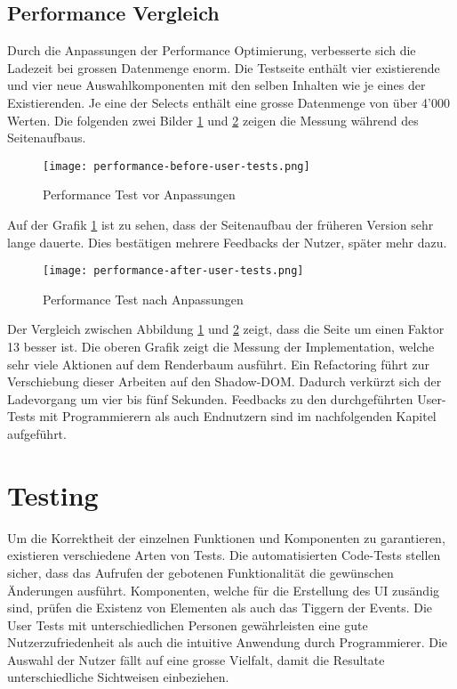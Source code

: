 \subsection{Performance Vergleich}
\label{sec:performanceCompare}

Durch die Anpassungen der Performance Optimierung, verbesserte sich die Ladezeit bei grossen Datenmenge enorm.
Die Testseite enthält vier existierende und vier neue Auswahlkomponenten mit den selben Inhalten wie je eines der Existierenden.
Je eine der Selects enthält eine grosse Datenmenge von über 4'000 Werten.
Die folgenden zwei Bilder \ref{img:PerformanceTestBefore} und \ref{img:PerformanceTestAfter} zeigen die Messung während des Seitenaufbaus.

\begin{figure}[!htb]
    \centering
    \texttt{[image: performance-before-user-tests.png]}
    \caption{Performance Test vor Anpassungen}
    \label{img:PerformanceTestBefore}
\end{figure}

Auf der Grafik \ref{img:PerformanceTestBefore} ist zu sehen, dass der Seitenaufbau der früheren Version sehr lange dauerte.
Dies bestätigen mehrere Feedbacks der Nutzer, später mehr dazu.

\begin{figure}[!htb]
    \centering
    \texttt{[image: performance-after-user-tests.png]}
    \caption{Performance Test nach Anpassungen}
    \label{img:PerformanceTestAfter}
\end{figure}

Der Vergleich zwischen Abbildung \ref{img:PerformanceTestBefore} und \ref{img:PerformanceTestAfter} zeigt, dass die Seite um einen Faktor 13 besser ist.
Die oberen Grafik zeigt die Messung der Implementation, welche sehr viele Aktionen auf dem Renderbaum ausführt.
Ein Refactoring führt zur Verschiebung dieser Arbeiten auf den Shadow-DOM.
Dadurch verkürzt sich der Ladevorgang um vier bis fünf Sekunden.
Feedbacks zu den durchgeführten User-Tests mit Programmierern als auch Endnutzern sind im nachfolgenden Kapitel aufgeführt.


\section{Testing}
\label{sec:testing}

Um die Korrektheit der einzelnen Funktionen und Komponenten zu garantieren, existieren verschiedene Arten von Tests.
Die automatisierten Code-Tests stellen sicher, dass das Aufrufen der gebotenen Funktionalität die gewünschen Änderungen ausführt.
Komponenten, welche für die Erstellung des UI zusändig sind, prüfen die Existenz von Elementen als auch das Tiggern der Events.
Die User Tests mit unterschiedlichen Personen gewährleisten eine gute Nutzerzufriedenheit als auch die intuitive Anwendung durch Programmierer.
Die Auswahl der Nutzer fällt auf eine grosse Vielfalt, damit die Resultate unterschiedliche Sichtweisen einbeziehen. 


